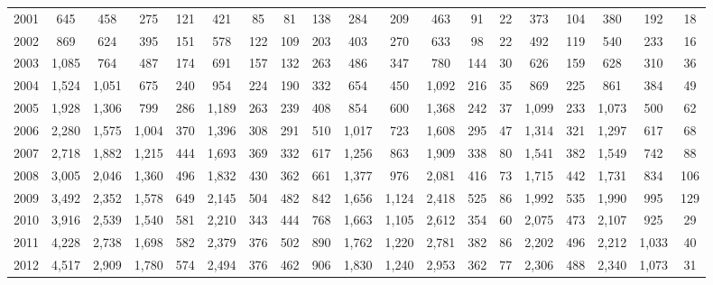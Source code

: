 \begin{table}[htbp]
\begin{tabular}{l*{18}{c}}
2001      &      645&      458&      275&      121&      421&       85&       81&      138&      284&      209&      463&       91&       22&      373&      104&      380&      192&       18\\
2002      &      869&      624&      395&      151&      578&      122&      109&      203&      403&      270&      633&       98&       22&      492&      119&      540&      233&       16\\
2003      &    1,085&      764&      487&      174&      691&      157&      132&      263&      486&      347&      780&      144&       30&      626&      159&      628&      310&       36\\
2004      &    1,524&    1,051&      675&      240&      954&      224&      190&      332&      654&      450&    1,092&      216&       35&      869&      225&      861&      384&       49\\
2005      &    1,928&    1,306&      799&      286&    1,189&      263&      239&      408&      854&      600&    1,368&      242&       37&    1,099&      233&    1,073&      500&       62\\
2006      &    2,280&    1,575&    1,004&      370&    1,396&      308&      291&      510&    1,017&      723&    1,608&      295&       47&    1,314&      321&    1,297&      617&       68\\
2007      &    2,718&    1,882&    1,215&      444&    1,693&      369&      332&      617&    1,256&      863&    1,909&      338&       80&    1,541&      382&    1,549&      742&       88\\
2008      &    3,005&    2,046&    1,360&      496&    1,832&      430&      362&      661&    1,377&      976&    2,081&      416&       73&    1,715&      442&    1,731&      834&      106\\
2009      &    3,492&    2,352&    1,578&      649&    2,145&      504&      482&      842&    1,656&    1,124&    2,418&      525&       86&    1,992&      535&    1,990&      995&      129\\
2010      &    3,916&    2,539&    1,540&      581&    2,210&      343&      444&      768&    1,663&    1,105&    2,612&      354&       60&    2,075&      473&    2,107&      925&       29\\
2011      &    4,228&    2,738&    1,698&      582&    2,379&      376&      502&      890&    1,762&    1,220&    2,781&      382&       86&    2,202&      496&    2,212&    1,033&       40\\
2012      &    4,517&    2,909&    1,780&      574&    2,494&      376&      462&      906&    1,830&    1,240&    2,953&      362&       77&    2,306&      488&    2,340&    1,073&       31\\

\end{tabular}
\end{table}
